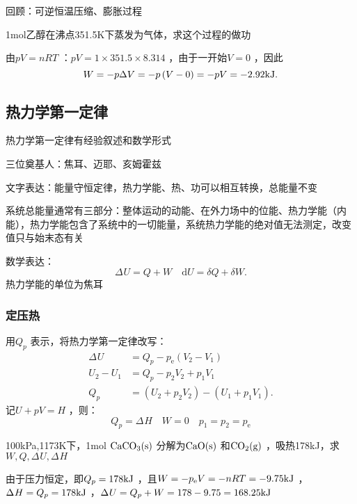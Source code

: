 回顾：可逆恒温压缩、膨胀过程
\begin{eg}
    1mol乙醇在沸点351.5K下蒸发为气体，求这个过程的做功
\end{eg}
\begin{sol}
    由$pV=nRT $ ：$pV=1\times 351.5\times 8.314$ ，由于一开始$V=0$ ，因此\[
        W = -p\Delta V = -p\left( V-0 \right)=-pV = -2.92\ce{kJ}
    .\]
\end{sol}
\subsection{热力学第一定律}%
\label{sub:热力学第一定律}
热力学第一定律有经验叙述和数学形式
\begin{notation}
    三位奠基人：焦耳、迈耶、亥姆霍兹
\end{notation}
文字表达：能量守恒定律，热力学能、热、功可以相互转换，总能量不变

系统总能量通常有三部分：整体运动的动能、在外力场中的位能、热力学能（内能），热力学能包含了系统中的一切能量，系统热力学能的绝对值无法测定，改变值只与始末态有关

数学表达：\[
    \Delta_\text{}U = Q+W \quad \mathrm{d}U = \delta Q + \delta W
.\]
热力学能的单位为焦耳
\subsubsection*{定压热}%
\label{subsub*:定压热}
用$Q_{p}$ 表示，将热力学第一定律改写：
\begin{align*}
    \Delta_\text{}U &= Q_{p}-p_\text{e}\left( V_2-V_1 \right)\\
    U_2-U_1&= Q_{p}-p_2V_2+p_1V_1 \\
    Q_{p} &= \left( U_2+p_2V_2 \right)-\left( U_1+p_1V_1 \right)
.\end{align*}
记$U+pV=H$ ，则：
\begin{equation}
    \label{eq:定压热}
    Q_{p} = \Delta_\text{}H \quad W= 0 \quad p_1=p_2=p_\text{e} 
\end{equation}
\begin{eg}
    100kPa,1173K下，1mol $\ce{CaCO_3}\text{(s)}$ 分解为$\ce{CaO}\text{(s)}$ 和$\ce{CO_2}\text{(g)}$ ，吸热178kJ，求$W,Q,\Delta_\text{}U ,\Delta_\text{}H $
\end{eg}
\begin{sol}
    由于压力恒定，即$Q_{p} = 178\ce{kJ}$ ，且$W=-p_\text{e}V = -nRT = -9.75\ce{kJ}$ ，$\Delta_\text{}H = Q_{p} = 178\ce{kJ} $ ，$\Delta_\text{}U = Q_{p} + W = 178-9.75 =168.25\ce{kJ}$
\end{sol}

